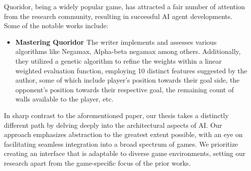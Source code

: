 Quoridor, being a widely popular game, has attracted a fair number of attention from the research community,
resulting in successful AI agent developments. Some of the notable works include:

\begin{itemize}
    \item \textbf{Mastering Quoridor \citep{Glendenning2002MasteringQ}}
    The writer implements and assesses various algorithms like Negamax, Alpha-beta negamax among others.
    Additionally, they utilized a genetic algorithm to refine the weights within a linear weighted evaluation
    function, employing 10 distinct features suggested by the author, some of which include player's position
    towards their goal side, the opponent's position towards their respective goal, the remaining count of
    walls available to the player, etc.
\end{itemize}


In sharp contrast to the aforementioned paper, our thesis takes a distinctly different path by delving deeply
into the architectural aspects of AI. Our approach emphasizes abstraction to the greatest extent possible, with
an eye on facilitating seamless integration into a broad spectrum of games. We prioritize creating an
interface that is adaptable to diverse game environments, setting our research apart from the game-specific
focus of the prior works.



